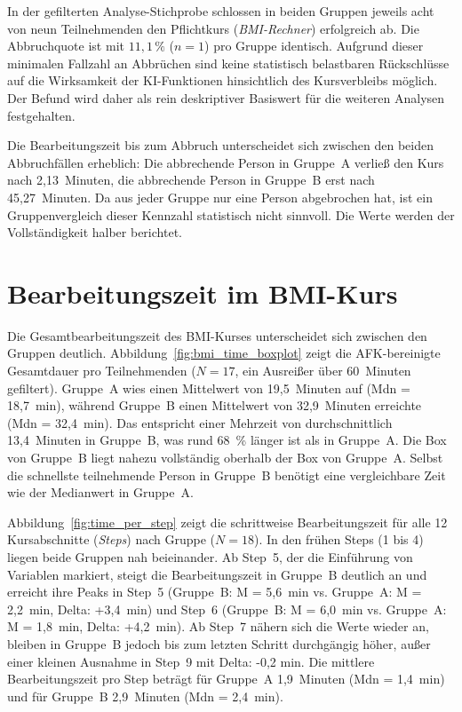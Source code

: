 In der gefilterten Analyse-Stichprobe schlossen in beiden Gruppen jeweils acht von neun Teilnehmenden den Pflichtkurs (\textit{BMI-Rechner}) erfolgreich ab. Die Abbruchquote ist mit \(11{,}1\,\%\) (\(n = 1\)) pro Gruppe identisch. Aufgrund dieser minimalen Fallzahl an Abbrüchen sind keine statistisch belastbaren Rückschlüsse auf die Wirksamkeit der KI-Funktionen hinsichtlich des Kursverbleibs möglich. Der Befund wird daher als rein deskriptiver Basiswert für die weiteren Analysen festgehalten.

Die Bearbeitungszeit bis zum Abbruch unterscheidet sich zwischen den beiden Abbruchfällen erheblich: Die abbrechende Person in Gruppe~A verließ den Kurs nach 2{,}13~Minuten, die abbrechende Person in Gruppe~B erst nach 45{,}27~Minuten. Da aus jeder Gruppe nur eine Person abgebrochen hat, ist ein Gruppenvergleich dieser Kennzahl statistisch nicht sinnvoll. Die Werte werden der Vollständigkeit halber berichtet.


\section{Bearbeitungszeit im BMI-Kurs}\label{sec:zeit}

Die Gesamtbearbeitungszeit des BMI-Kurses unterscheidet sich zwischen den Gruppen deutlich. Abbildung~\ref{fig:bmi_time_boxplot} zeigt die AFK-bereinigte Gesamtdauer pro Teilnehmenden (\(N = 17\), ein Ausreißer über 60~Minuten gefiltert). Gruppe~A wies einen Mittelwert von 19{,}5~Minuten auf (Mdn = 18{,}7~min), während Gruppe~B einen Mittelwert von 32{,}9~Minuten erreichte (Mdn = 32{,}4~min). Das entspricht einer Mehrzeit von durchschnittlich 13{,}4~Minuten in Gruppe~B, was rund 68~\% länger ist als in Gruppe~A. Die Box von Gruppe~B liegt nahezu vollständig oberhalb der Box von Gruppe~A. Selbst die schnellste teilnehmende Person in Gruppe~B benötigt eine vergleichbare Zeit wie der Medianwert in Gruppe~A.

Abbildung~\ref{fig:time_per_step} zeigt die schrittweise Bearbeitungszeit für alle 12 Kursabschnitte (\textit{Steps}) nach Gruppe (\(N = 18\)). In den frühen Steps (1 bis 4) liegen beide Gruppen nah beieinander. Ab Step~5, der die Einführung von Variablen markiert, steigt die Bearbeitungszeit in Gruppe~B deutlich an und erreicht ihre Peaks in Step~5 (Gruppe~B: M = 5{,}6~min vs. Gruppe~A: M = 2{,}2~min, Delta: +3{,}4~min) und Step~6 (Gruppe~B: M = 6{,}0~min vs. Gruppe~A: M = 1{,}8~min, Delta: +4{,}2~min). Ab Step~7 nähern sich die Werte wieder an, bleiben in Gruppe~B jedoch bis zum letzten Schritt durchgängig höher, außer einer kleinen Ausnahme in Step~9 mit Delta: -0,2 min. Die mittlere Bearbeitungszeit pro Step beträgt für Gruppe~A 1{,}9~Minuten (Mdn = 1{,}4~min) und für Gruppe~B 2{,}9~Minuten (Mdn = 2{,}4~min).

